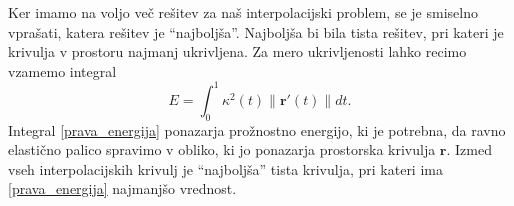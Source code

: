 \documentclass[12pt,a4paper,twoside]{article}
\theoremstyle{definition} %
\theoremstyle{plain} %
\theoremstyle{primerstyle}
\numberwithin{equation}{section}  %
\newcommand{\tV}{\mathbf{t}}
\newcommand{\bV}{\mathbf{b}}
\newcommand{\dV}{\mathbf{d}}
\newcommand{\pV}{\mathbf{p}}
\newcommand{\rV}{\mathbf{r}}
\begin{document}
Ker imamo na voljo več rešitev za naš interpolacijski problem, se je smiselno vprašati, katera rešitev je ``najboljša''. Najboljša bi bila tista rešitev, pri kateri je krivulja v prostoru najmanj ukrivljena. Za mero ukrivljenosti lahko recimo vzamemo integral
\begin{equation}
	\label{prava_energija}
	E=\int_0^1\kappa^2(t)\lVert\rV'(t)\rVert dt.
\end{equation}
Integral \eqref{prava_energija} ponazarja prožnostno energijo, ki je potrebna, da ravno elastično palico spravimo v obliko, ki jo ponazarja prostorska krivulja $\rV.$ %
Izmed vseh interpolacijskih krivulj je ``najboljša'' tista krivulja, pri kateri ima \eqref{prava_energija} najmanjšo vrednost.
\end{document}
